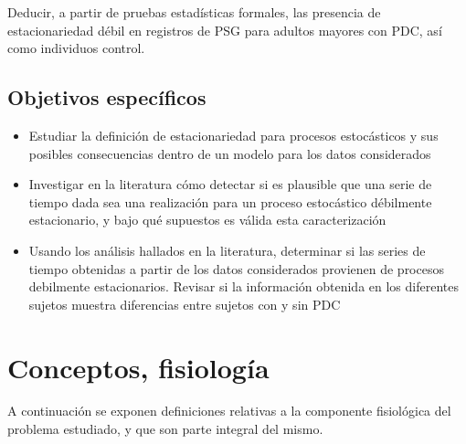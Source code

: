 \documentclass[12pt,a4paper]{mitthesis}
\begin{document}
Deducir, a partir de pruebas estad\'isticas formales, las presencia de estacionariedad d\'ebil en
registros de PSG para adultos mayores con PDC, as\'i como individuos control.


\subsection{Objetivos espec\'ificos}

\begin{itemize}
\item Estudiar la definici\'on de estacionariedad para procesos estoc\'asticos y sus posibles 
consecuencias dentro de un modelo para los datos considerados

\item Investigar en la literatura c\'omo detectar si es plausible que una serie de tiempo dada sea 
una realizaci\'on para un proceso estoc\'astico d\'ebilmente estacionario, y bajo qu\'e supuestos 
es v\'alida esta caracterizaci\'on

\item Usando los an\'alisis hallados en la literatura, determinar si las series de tiempo 
obtenidas a partir de los datos considerados provienen de procesos debilmente estacionarios.
Revisar si la informaci\'on obtenida en los diferentes sujetos muestra diferencias entre sujetos 
con y sin PDC
\end{itemize}


\section{Conceptos, fisiolog\'ia}

A continuaci\'on se exponen definiciones relativas a la componente fisiol\'ogica del problema
estudiado, y que son parte integral del mismo. 
\end{document}
